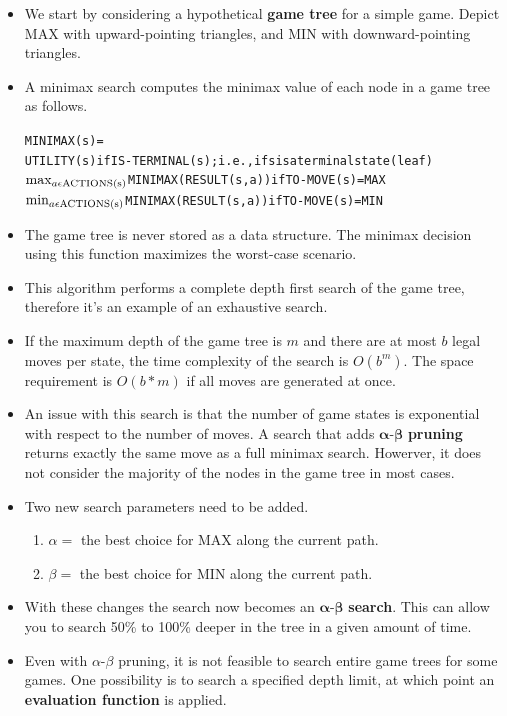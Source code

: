 \documentclass{article}
\begin{document}
\begin{itemize}
\begin{itemize}
\begin{itemize}
            \item We start by considering a hypothetical \textbf{game tree} for a simple game. Depict MAX with upward-pointing triangles, and MIN with downward-pointing triangles.
            \item A minimax search computes the minimax value of each node in a game tree as follows.
\begin{alltt}
MINIMAX (s) =
  UTILITY(s) if IS-TERMINAL(s); i.e., if s is a terminal state (leaf)
  \(\textnormal{max}\sb{a\epsilon\textnormal{ACTIONS(s)}}\) MINIMAX(RESULT(s, a)) if TO-MOVE(s) = MAX
  \(\textnormal{min}\sb{a\epsilon\textnormal{ACTIONS(s)}}\) MINIMAX(RESULT(s, a)) if TO-MOVE(s) = MIN
\end{alltt}
            \item The game tree is never stored as a data structure. The minimax decision using this function maximizes the worst-case scenario.
            \item This algorithm performs a complete depth first search of the game tree, therefore it's an example of an exhaustive search.
            \item If the maximum depth of the game tree is \(m\) and there are at most \(b\) legal moves per state, the time complexity of the search is \(O(b^m)\). The space requirement is \(O(b*m)\) if all moves are generated at once.
            \item An issue with this search is that the number of game states is exponential with respect to the number of moves. A search that adds \(\bm{\alpha}\)-\(\bm{\beta}\) \textbf{pruning} returns exactly the same move as a full minimax search. Howerver, it does not consider the majority of the nodes in the game tree in most cases.
            \item Two new search parameters need to be added.
            \begin{enumerate}
                \item \(\alpha=\) the best choice for MAX along the current path.
                \item \(\beta=\) the best choice for MIN along the current path.
            \end {enumerate}
            \item With these changes the search now becomes an \(\bm{\alpha}\)-\(\bm{\beta}\) \textbf{search}. This can allow you to search 50\% to 100\% deeper in the tree in a given amount of time.
            \item Even with \(\alpha\)-\(\beta\) pruning, it is not feasible to search entire game trees for some games. One possibility is to search a specified depth limit, at which point an \textbf{evaluation function} is applied.

\end{itemize}
\end{itemize}
\end{itemize}
\end{document}
